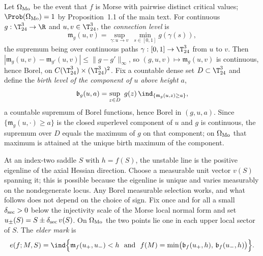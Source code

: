 \begin{definition}\label{def:selection-mark}
Let $\Omega_{\rm Mo}$ be the event that $f$ is Morse with pairwise distinct critical values; $\Prob(\Omega_{\rm Mo})=1$ by Proposition~1.1 of the main text. For continuous $g:\T^3_{24}\to\R$ and $u,v\in\T^3_{24}$, the \emph{connection level} is
\begin{equation}\label{eq:selection-connection}
\mathfrak m_g(u,v)=\sup_{\gamma:u\to v}\ \min_{s\in[0,1]}g(\gamma(s)),
\end{equation}
the supremum being over continuous paths $\gamma:[0,1]\to\T^3_{24}$ from $u$ to $v$. Then $|\mathfrak m_g(u,v)-\mathfrak m_{g'}(u,v)|\le\|g-g'\|_\infty$, so $(g,u,v)\mapsto\mathfrak m_g(u,v)$ is continuous, hence Borel, on $C(\T^3_{24})\times(\T^3_{24})^2$. Fix a countable dense set $D\subset\T^3_{24}$ and define the \emph{birth level of the component of $u$ above height $a$},
\begin{equation}\label{eq:selection-birth}
\mathfrak b_g(u,a)=\sup_{z\in D}\ g(z)\,\ind_{\{\mathfrak m_g(u,z)\ge a\}},
\end{equation}
a countable supremum of Borel functions, hence Borel in $(g,u,a)$. Since $\{\mathfrak m_g(u,\cdot)\ge a\}$ is the closed superlevel component of $u$ and $g$ is continuous, the supremum over $D$ equals the maximum of $g$ on that component; on $\Omega_{\rm Mo}$ that maximum is attained at the unique birth maximum of the component.

At an index-two saddle $S$ with $h=f(S)$, the unstable line is the positive eigenline of the axial Hessian direction. Choose a measurable unit vector $v(S)$ spanning it; this is possible because the eigenline is unique and varies measurably on the nondegenerate locus. Any Borel measurable selection works, and what follows does not depend on the choice of sign. Fix once and for all a small $\delta_{\rm sec}>0$ below the injectivity scale of the Morse local normal form and set $u_\pm(S)=S\pm\delta_{\rm sec}\,v(S)$. On $\Omega_{\rm Mo}$ the two points lie one in each upper local sector of $S$. The \emph{elder mark} is
\begin{equation}\label{eq:selection-mark}
e(f;M,S)=\ind\Bigl\{\mathfrak m_f(u_+,u_-)<h\ \ \text{and}\ \ f(M)=\min\bigl(\mathfrak b_f(u_+,h),\,\mathfrak b_f(u_-,h)\bigr)\Bigr\}.
\end{equation}
\end{definition}

